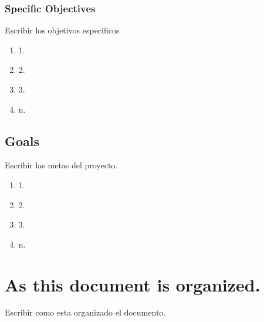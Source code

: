 \subsubsection{Specific Objectives}

Escribir los objetivos especificos
\begin{enumerate}
\item 1.
\item 2.
\item 3. 
\item n.
  

\end{enumerate}

\subsection{Goals}

Escribir las metas del proyecto.

\begin{enumerate}
\item 1.
\item 2.
\item 3.
\item n.
\end{enumerate}



\section{As this document is organized.}
Escribir como esta organizado el documento.
